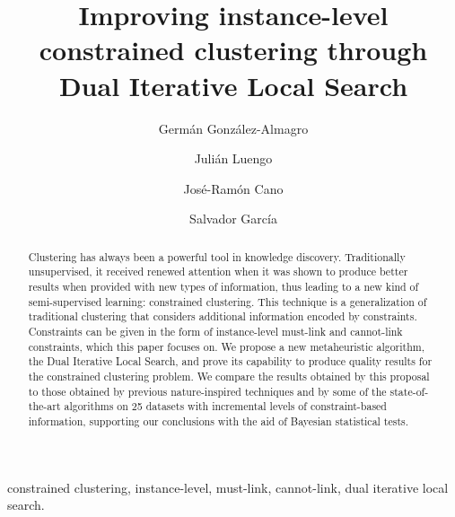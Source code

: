\documentclass[review]{elsarticle}
\begin{document}
\begin{frontmatter}

\title{Improving instance-level constrained clustering through Dual Iterative Local Search}

\author[mymainaddress]{Germ\'an Gonz\'alez-Almagro}

\author[mymainaddress]{Juli\'an Luengo}

\author[mysecondaddress]{Jos\'e-Ram\'on Cano}

\author[mymainaddress]{Salvador Garc\'ia}

\address[mymainaddress]{DaSCI Andalusian Institute of Data Science and Computational Intelligence, University of Granada, Spain}

\address[mysecondaddress]{Dept. of Computer Science, EPS of Linares, University of Ja\'en, Campus Cient\'ifico Tecnol\'ogico de Linares, Cintur\'on Sur S/N, Linares 23700, Ja\'en, Spain}

\begin{abstract}
Clustering has always been a powerful tool in knowledge discovery. Traditionally unsupervised, it received renewed attention when it was shown to produce better results when provided with new types of information, thus leading to a new kind of semi-supervised learning: constrained clustering. This technique is a generalization of traditional clustering that considers additional information encoded by constraints. Constraints can be given in the form of instance-level
must-link and cannot-link constraints, which this paper focuses on. We propose a new metaheuristic algorithm, the Dual Iterative Local Search, and prove its capability to produce quality results for the constrained clustering problem. We compare the results obtained by this proposal to those obtained by previous nature-inspired techniques and by some of the state-of-the-art algorithms on 25 datasets with incremental levels of constraint-based information, supporting our conclusions with the aid of Bayesian statistical tests.
\end{abstract}

\begin{keyword}
constrained clustering, instance-level, must-link, cannot-link, dual iterative local search.
\end{keyword}

\end{frontmatter}

\linenumbers
\end{document}
